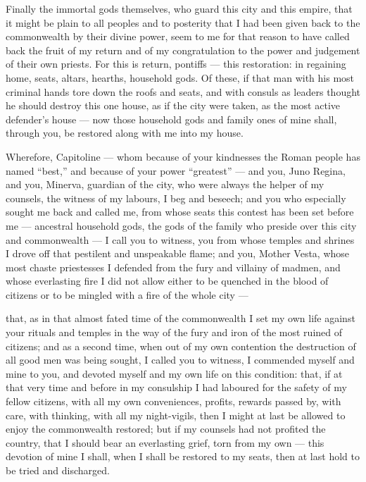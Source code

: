  Finally the immortal gods themselves, who guard this city and this empire, that it might be plain to all peoples and to posterity that I had been given back to the commonwealth by their divine power, seem to me for that reason to have called back the fruit of my return and of my congratulation to the power and judgement of their own priests. For this is return, pontiffs --- this restoration: in regaining home, seats, altars, hearths, household gods. Of these, if that man with his most criminal hands tore down the roofs and seats, and with consuls as leaders thought he should destroy this one house, as if the city were taken, as the most active defender's house --- now those household gods and family ones of mine shall, through you, be restored along with me into my house.

 Wherefore, Capitoline --- whom because of your kindnesses the Roman people has named ``best,'' and because of your power ``greatest'' --- and you, Juno Regina, and you, Minerva, guardian of the city, who were always the helper of my counsels, the witness of my labours, I beg and beseech; and you who especially sought me back and called me, from whose seats this contest has been set before me --- ancestral household gods, the gods of the family who preside over this city and commonwealth --- I call you to witness, you from whose temples and shrines I drove off that pestilent and unspeakable flame; and you, Mother Vesta, whose most chaste priestesses I defended from the fury and villainy of madmen, and whose everlasting fire I did not allow either to be quenched in the blood of citizens or to be mingled with a fire of the whole city ---

 that, as in that almost fated time of the commonwealth I set my own life against your rituals and temples in the way of the fury and iron of the most ruined of citizens; and as a second time, when out of my own contention the destruction of all good men was being sought, I called you to witness, I commended myself and mine to you, and devoted myself and my own life on this condition: that, if at that very time and before in my consulship I had laboured for the safety of my fellow citizens, with all my own conveniences, profits, rewards passed by, with care, with thinking, with all my night-vigils, then I might at last be allowed to enjoy the commonwealth restored; but if my counsels had not profited the country, that I should bear an everlasting grief, torn from my own --- this devotion of mine I shall, when I shall be restored to my seats, then at last hold to be tried and discharged.

